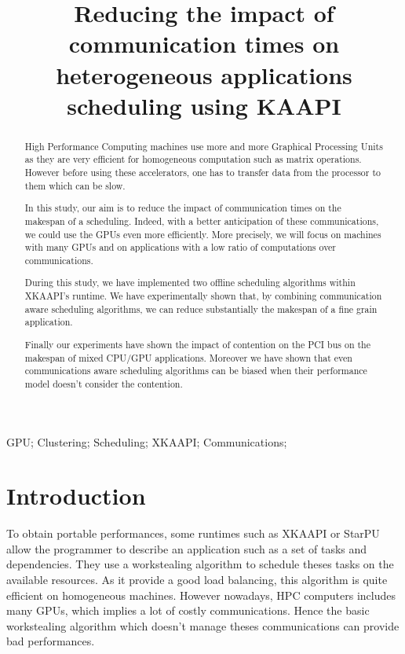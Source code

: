 \documentclass[10pt, conference, compsocconf]{IEEEtran}
\author{\IEEEauthorblockN{David Beniamine, Guillaume Huard}
    \IEEEauthorblockA{
        Université Joseph Fourier\\
        Laboratoire d'Informatique de Grenoble - Inria\\
        38330 Montbonnot St Martin, France\\
    david.beniamine@imag.fr, guillaume.huard@imag.fr}
}
\title{Reducing the impact of communication times on heterogeneous
applications scheduling using KAAPI }
\begin{document}

\maketitle%
\begin{abstract}
    High Performance Computing machines use more and more Graphical Processing
    Units as they are very efficient for homogeneous computation such as
    matrix operations. However before using these accelerators, one has to
    transfer data from the processor to them which can be slow. 

    In this study, our aim is to reduce the impact of communication times on
    the makespan of a scheduling. Indeed, with a better anticipation of these
    communications, we could use the GPUs even more efficiently. More
    precisely, we will focus on machines with many GPUs and on applications
    with a low ratio of computations over communications. 

    During this study, we have implemented two offline scheduling algorithms
    within  XKAAPI's runtime.  We have experimentally shown that, by combining
    communication aware scheduling algorithms, we can reduce substantially the
    makespan of a fine grain application.

    Finally our experiments have shown the impact of contention on the PCI bus
    on the makespan of mixed CPU/GPU applications. Moreover we have shown that
    even communications aware scheduling algorithms can be biased when their
    performance model doesn't consider the contention.

\end{abstract}

\begin{IEEEkeywords}
    GPU; Clustering; Scheduling; XKAAPI; Communications;

\end{IEEEkeywords}




\section{Introduction}

To obtain portable performances, some runtimes such as XKAAPI
\cite{gautierxkaapi} or StarPU \cite{augonnet2011starpu} allow the programmer
to describe an application such as a set of tasks and dependencies.  They use
a workstealing algorithm \cite{blumofe1995cilk} to schedule theses tasks on
the available resources. As it provide a good load balancing, this algorithm
is quite efficient on homogeneous machines. However nowadays, HPC computers
includes many GPUs, which implies a lot of costly communications. Hence the
basic workstealing algorithm which doesn't manage theses communications can
provide bad performances.
\end{document}
